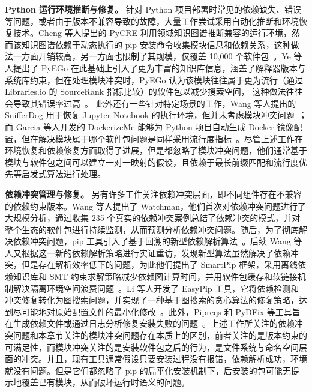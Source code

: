 \textbf{Python 运行环境推断与修复。} 针对 Python 项目部署时常见的依赖缺失、错误等问题，或者由于版本不兼容导致的故障，大量工作尝试采用自动化推断和环境恢复技术。Cheng 等人提出的 PyCRE 利用领域知识图谱推断兼容的运行环境，然而该知识图谱依赖于动态执行的 pip 安装命令收集模块信息和依赖关系，这种做法一方面开销较高，另一方面也限制了其规模，仅覆盖 10,000 个软件包~\cite{cheng2022conflict}。Ye 等人提出了 PyEGo 在此基础上引入了更为丰富的知识库信息，涵盖了解释器版本与系统库约束，但在处理模块冲突时，PyEGo 认为该模块往往属于更为流行（通过 Libraries.io 的 SourceRank 指标比较）的软件包以减少搜索空间， 这种做法往往会导致其错误率过高~\cite{ye2022knowledge}。
此外还有一些针对特定场景的工作，Wang 等人提出的 SnifferDog 用于恢复 Jupyter Notebook 的执行环境，但并未考虑模块冲突问题~\cite{wang2021restoring}；而 Garcia 等人开发的 DockerizeMe 能够为 Python 项目自动生成 Docker 镜像配置，但在解决模块属于哪个软件包问题是同样采用流行度指标~\cite{horton2019dockerizeme}。尽管上述工作在环境恢复和依赖修复方面取得了进展，但是都忽略了模块冲突问题，他们通常基于模块与软件包之间可以建立一对一映射的假设，且依赖于最长前缀匹配和流行度优先等启发式算法进行处理。

\textbf{依赖冲突管理与修复。} 另有许多工作关注依赖冲突层面，即不同组件存在不兼容的依赖约束版本。Wang 等人提出了 Watchman，他们首次对依赖冲突问题进行了大规模分析，通过收集 235 个真实的依赖冲突案例总结了依赖冲突的模式，并对整个生态的软件包进行持续监测，从而预测分析依赖冲突问题。随后，为了彻底解决依赖冲突问题，pip 工具引入了基于回溯的新型依赖解析算法~\cite{pip2025dependency}。后续 Wang 等人又根据这一新的依赖解析策略进行实证重访，发现新型算法虽然解决了依赖冲突，但是存在解析效率低下的问题，为此他们提出了 SmartPip 框架，采用离线依赖知识库和 SMT 约束求解策略减少依赖图计算时间，并用软件包缓存和软链接机制解决隔离环境空间浪费问题~\cite{wang2022smartpip}。Li 等人开发了 EasyPip 工具，它将依赖检测和冲突修复转化为图搜索问题，并实现了一种基于图搜索的贪心算法的修复策略，达到尽可能地对原始配置文件的最小化修改~\cite{li2023easypip}。此外，Pipreqs 和 PyDFix 等工具旨在生成依赖文件或通过日志分析修复安装失败的问题~\cite{pipreq,mukherjee2021fixing}。上述工作所关注的依赖冲突问题和本章节关注的模块冲突问题存在本质上的区别，前者关注的是版本约束的可满足性，而模块冲突关注的是安装软件包之后的行为，是文件系统与命名空间层面的冲突。并且，现有工具通常假设只要安装过程没有报错，依赖解析成功，环境就没有问题。但是它们都忽略了 pip 的扁平化安装机制下，后安装的包可能无提示地覆盖已有模块，从而破坏运行时语义的问题。

